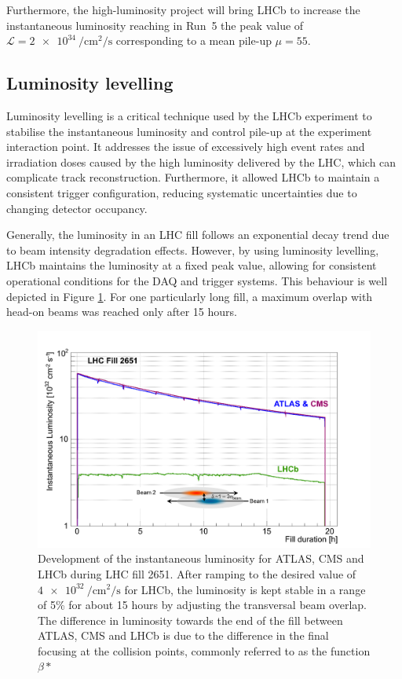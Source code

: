 Furthermore, the high-luminosity project will bring LHCb to increase the instantaneous luminosity reaching in Run~5 the peak value of $\mathcal{L}=\SI{2e34}{\per\centi\meter\squared\per\second}$ corresponding to a mean pile-up $\mu=55$.

\subsection{Luminosity levelling}\label{sec:lumi_levelling}

Luminosity levelling is a critical technique used by the LHCb experiment to stabilise the instantaneous luminosity and control pile-up at the experiment interaction point. It addresses the issue of excessively high event rates and irradiation doses caused by the high luminosity delivered by the LHC, which can complicate track reconstruction. Furthermore, it allowed LHCb to maintain a consistent trigger configuration, reducing systematic uncertainties due to changing detector occupancy.

Generally, the luminosity in an LHC fill follows an exponential decay trend due to beam intensity degradation effects. However, by using luminosity levelling, LHCb maintains the luminosity at a fixed peak value, allowing for consistent operational conditions for the DAQ and trigger systems.  This behaviour is well depicted in Figure \ref{fig:lumi-leveling}. For one particularly long fill, a maximum overlap with head-on beams was reached only after 15 hours. 

\begin{figure}
    \centering
    \includegraphics[width=\textwidth]{figures/luminosity_leveling.png}
    \caption{Development of the instantaneous luminosity for ATLAS, CMS and LHCb during LHC fill 2651. After ramping to the desired value of $\SI{4e32}{\per\centi\meter\squared\per\second}$ for LHCb, the luminosity is kept stable in a range of 5\% for about 15 hours by adjusting the transversal beam overlap.
    The difference in luminosity towards the end of the fill between ATLAS, CMS and LHCb is due to the difference in the final focusing at the collision points, commonly referred to as the function $\beta*$}
    \label{fig:lumi-leveling}
\end{figure}


